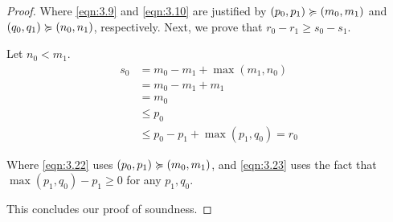 \begin{proof}
   Where \cref{eqn:3.9} and \cref{eqn:3.10} are justified by \((p_0, p_1) \succcurlyeq (m_0, m_1)\) and \((q_0, q_1) \succcurlyeq (n_0, n_1)\), respectively. Next, we prove that \(r_0 - r_1 \geq s_0 - s_1\).

   Let \(n_0 < m_1\). 
   \begin{align}
      s_0   &= m_0 - m_1 + \max(m_1, n_0) \\
            &= m_0 - m_1 + m_1 \\
            &= m_0 \\
            &\leq p_0 \label{eqn:3.22}\\
            &\leq p_0 - p_1 + \max(p_1, q_0) = r_0 \label{eqn:3.23}
   \end{align}

   Where \cref{eqn:3.22} uses \((p_0, p_1) \succcurlyeq (m_0, m_1)\), and \cref{eqn:3.23} uses the fact that \(\max(p_1, q_0) - p_1 \geq 0\) for any \(p_1, q_0\).

   This concludes our proof of soundness.
\end{proof}
